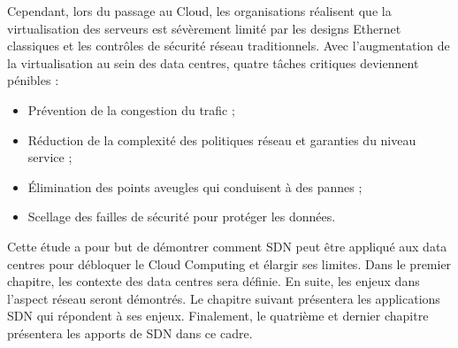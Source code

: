 \par
Cependant, lors du passage au Cloud, les organisations réalisent que la virtualisation des serveurs est sévèrement limité par les designs Ethernet classiques et les contrôles de sécurité réseau traditionnels. Avec l'augmentation de la virtualisation au sein des data centres, quatre tâches critiques deviennent pénibles :
\begin{itemize}
\item Prévention de la congestion du trafic ;
\item Réduction de la complexité des politiques réseau et garanties du niveau service ;
\item Élimination des points aveugles qui conduisent à des pannes ;
\item  Scellage des failles de sécurité pour protéger les données.
\end{itemize}

\par
Cette étude a pour but de démontrer comment SDN peut être appliqué aux data centres pour débloquer le Cloud Computing et élargir ses limites. Dans le premier chapitre, les contexte des data centres sera définie. En suite, les enjeux dans l'aspect réseau seront démontrés. Le chapitre suivant présentera les applications SDN qui répondent à ses enjeux. Finalement, le quatrième et dernier chapitre présentera les apports de SDN dans ce cadre.

